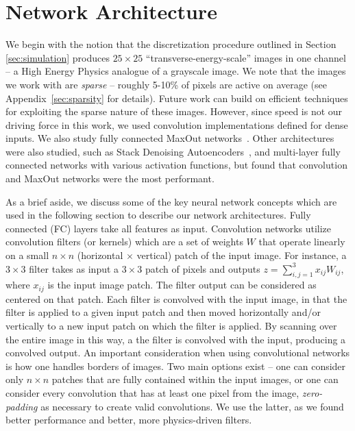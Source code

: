 
\section{Network Architecture}
\label{sec:arch}

We begin with the notion that the discretization procedure outlined in Section \ref{sec:simulation} produces $25\times 25$ ``transverse-energy-scale'' images in one channel -- a High Energy Physics analogue of a grayscale image. We note that the images we work with are \emph{sparse} -- roughly 5-10\% of pixels are active on average (see Appendix~\ref{sec:sparsity} for details). Future work can build on efficient techniques for exploiting the sparse nature of these images. However, since speed is not our driving force in this work, we used convolution implementations defined for dense inputs.  We also study fully connected MaxOut networks~\cite{maxout:goodfellow}.  Other architectures were also studied, such as Stack Denoising Autoencoders~\cite{SDAE}, and multi-layer fully connected networks with various activation functions, but found that convolution and MaxOut networks were the most performant.

As a brief aside, we discuss some of the key neural network concepts which are used in the following section to describe our network architectures.  Fully connected (FC) layers take all features as input.  Convolution networks utilize convolution filters (or kernels) which are a set of weights $W$ that operate linearly on a small $n\times n$ (horizontal $\times$ vertical) patch of the input image.  For instance, a $3\times3$ filter takes as input a $3\times3$ patch of pixels and outputs $z = \sum_{i,j=1}^{3} x_{ij}W_{ij}$, where $x_{ij}$ is the input image patch.  The filter output can be considered as centered on that patch.  Each filter is convolved with the input image, in that the filter is applied to a given input patch and then moved horizontally and/or vertically to a new input patch on which the filter is applied.  By scanning over the entire image in this way, a the filter is convolved with the input, producing a convolved output. An important consideration when using convolutional networks is how one handles borders of images. Two main options exist -- one can consider only $n\times n$ patches that are fully contained within the input images, or one can consider every convolution that has at least one pixel from the image, \emph{zero-padding} as necessary to create valid convolutions. We use the latter, as we found better performance and better, more physics-driven filters. 

